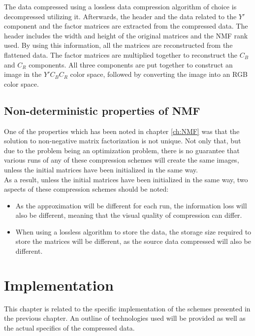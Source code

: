 \documentclass[thesis=M,english]{FITthesis}[2012/10/20]
\begin{document}
The data compressed using a lossless data compression algorithm of choice is decompressed
utilizing it. Afterwards, the header and the data related to the $Y'$ component and the factor matrices
are extracted from the compressed data. The header includes the width and height of the
original matrices and the NMF rank used. By using this information, all the matrices
are reconstructed from the flattened data. The factor matrices are multiplied together
to reconstruct the $C_B$ and $C_R$ components. All three components are put together
to construct an image in the $Y'C_BC_R$ color space, followed by converting the
image into an RGB color space.


\section{Non-deterministic properties of NMF}
One of the properties which has been noted in chapter \ref{ch:NMF} was that
the solution to non-negative matrix factorization is not unique. Not only that,
but due to the problem being an optimization problem, there is no guarantee that
various runs of any of these compression schemes will create the same images, unless
the initial matrices have been initialized in the same way.
\\

As a result, unless the initial matrices have been initialized in the same way,
two aspects of these compression schemes should be noted:
\begin{itemize}
  \item As the approximation will be different for each run, the information loss will
  also be different, meaning that the visual quality of compression can differ.
  \item When using a lossless algorithm to store the data, the storage size required
  to store the matrices will be different, as the source data compressed will also
  be different.
\end{itemize}


\chapter{Implementation}
\label{ch:implementation}
This chapter is related to the specific implementation of the schemes presented in the
previous chapter. An outline of technologies used will be provided as well as the actual
specifics of the compressed data.
\end{document}
